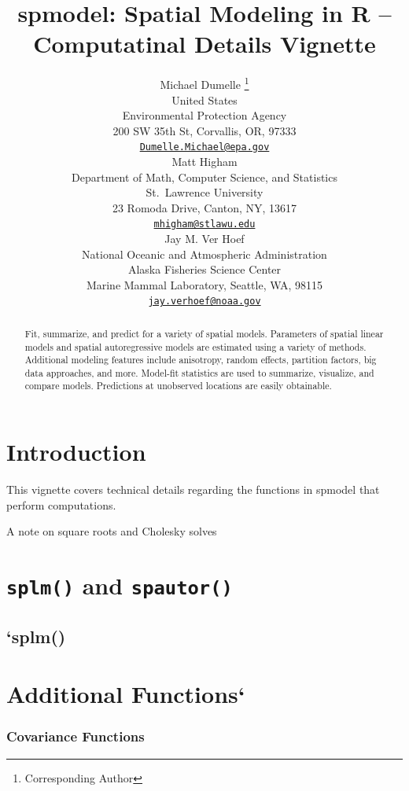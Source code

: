 \documentclass{article}
\title{spmodel: Spatial Modeling in \textbf{R} -- Computatinal Details Vignette}
\author{
    Michael Dumelle
    \thanks{Corresponding Author}
   \\
    United States \\
    Environmental Protection Agency \\
  200 SW 35th St, Corvallis, OR, 97333 \\
  \texttt{\href{mailto:Dumelle.Michael@epa.gov}{\nolinkurl{Dumelle.Michael@epa.gov}}} \\
   \And
    Matt Higham
   \\
    Department of Math, Computer Science, and Statistics \\
    St.~Lawrence University \\
  23 Romoda Drive, Canton, NY, 13617 \\
  \texttt{\href{mailto:mhigham@stlawu.edu}{\nolinkurl{mhigham@stlawu.edu}}} \\
   \And
    Jay M. Ver Hoef
   \\
    National Oceanic and Atmospheric Administration \\
    Alaska Fisheries Science Center \\
  Marine Mammal Laboratory, Seattle, WA, 98115 \\
  \texttt{\href{mailto:jay.verhoef@noaa.gov}{\nolinkurl{jay.verhoef@noaa.gov}}} \\
  }
\begin{document}
\maketitle


\begin{abstract}
Fit, summarize, and predict for a variety of spatial models. Parameters
of spatial linear models and spatial autoregressive models are estimated
using a variety of methods. Additional modeling features include
anisotropy, random effects, partition factors, big data approaches, and
more. Model-fit statistics are used to summarize, visualize, and compare
models. Predictions at unobserved locations are easily obtainable.
\end{abstract}


\hypertarget{introduction}{%
\section{Introduction}\label{introduction}}

This vignette covers technical details regarding the functions in
spmodel that perform computations.

A note on square roots and Cholesky solves

\hypertarget{splm-and-spautor}{%
\section{\texorpdfstring{\texttt{splm()} and
\texttt{spautor()}}{splm() and spautor()}}\label{splm-and-spautor}}

\hypertarget{splm}{%
\subsection{`splm()}\label{splm}}

\hypertarget{additional-functions}{%
\section{Additional Functions`}\label{additional-functions}}

\hypertarget{covariance-functions}{%
\subsubsection{Covariance Functions}\label{covariance-functions}}
\end{document}
